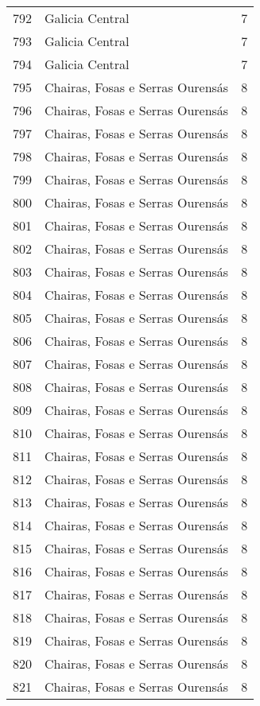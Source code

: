 \begin{table}[p]
\begin{tabular}{rlr}
  792 & Galicia Central &   7 \\ 
  793 & Galicia Central &   7 \\ 
  794 & Galicia Central &   7 \\ 
  795 & Chairas, Fosas e Serras Ourensás &   8 \\ 
  796 & Chairas, Fosas e Serras Ourensás &   8 \\ 
  797 & Chairas, Fosas e Serras Ourensás &   8 \\ 
  798 & Chairas, Fosas e Serras Ourensás &   8 \\ 
  799 & Chairas, Fosas e Serras Ourensás &   8 \\ 
  800 & Chairas, Fosas e Serras Ourensás &   8 \\ 
  801 & Chairas, Fosas e Serras Ourensás &   8 \\ 
  802 & Chairas, Fosas e Serras Ourensás &   8 \\ 
  803 & Chairas, Fosas e Serras Ourensás &   8 \\ 
  804 & Chairas, Fosas e Serras Ourensás &   8 \\ 
  805 & Chairas, Fosas e Serras Ourensás &   8 \\ 
  806 & Chairas, Fosas e Serras Ourensás &   8 \\ 
  807 & Chairas, Fosas e Serras Ourensás &   8 \\ 
  808 & Chairas, Fosas e Serras Ourensás &   8 \\ 
  809 & Chairas, Fosas e Serras Ourensás &   8 \\ 
  810 & Chairas, Fosas e Serras Ourensás &   8 \\ 
  811 & Chairas, Fosas e Serras Ourensás &   8 \\ 
  812 & Chairas, Fosas e Serras Ourensás &   8 \\ 
  813 & Chairas, Fosas e Serras Ourensás &   8 \\ 
  814 & Chairas, Fosas e Serras Ourensás &   8 \\ 
  815 & Chairas, Fosas e Serras Ourensás &   8 \\ 
  816 & Chairas, Fosas e Serras Ourensás &   8 \\ 
  817 & Chairas, Fosas e Serras Ourensás &   8 \\ 
  818 & Chairas, Fosas e Serras Ourensás &   8 \\ 
  819 & Chairas, Fosas e Serras Ourensás &   8 \\ 
  820 & Chairas, Fosas e Serras Ourensás &   8 \\ 
  821 & Chairas, Fosas e Serras Ourensás &   8 \\ 

\end{tabular}
\end{table}
